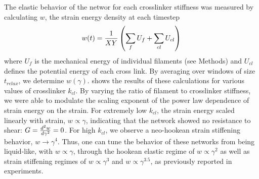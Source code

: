 \documentclass[12pt]{article}
\begin{document}
\par
The elastic behavior of the networ for each crosslinker stiffness was measured
by calculating $w$, the strain energy density at each timestep
\begin{equation}
  w(t) = {1\over X Y}\left(\sum_f{ U_f}+\sum_{cl}{U_{cl}}\right)
  \label{eqn:sed}
\end{equation}
where $U_f$ is the mechanical energy of individual filaments (see Methods) and 
$U_{cl}$ defines the potential energy of each cross link. By averaging
over windows of size $t_{relax}$, we determine $w(\gamma)$.  
shows the results of these calculations for various values of
crosslinker $k_{cl}$. By varying the ratio of filament to crosslinker stiffness,
we were able to modulate the scaling exponent of the power law dependence of 
strain energy on the strain. For extremely low $k_{cl}$, the strain energy
scaled linearly with strain, $w\propto \gamma$, indicating that the network 
showed no resistance to shear: $G={d^2w\over d\gamma^2}=0$. For high $k_{cl}$, 
we observe a neo-hookean strain stiffening behavior, $w\rightarrow\gamma^4$\cite{shokef2012}. 
Thus, one can tune the behavior of these networks from being liquid-like, 
with $w\propto\gamma$, through the hookean elastic regime of $w\propto\gamma^2$ 
as well as strain stiffening regimes of $w\propto\gamma^3$ and
$w\propto\gamma^{3.5}$, as previously reported in experiments\cite{gardel2004, kasza2009}. 
\end{document}
